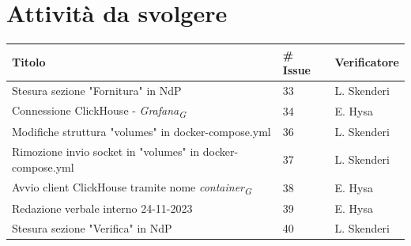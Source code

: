 \documentclass{article}
\begin{document}
\section{Attività da svolgere}
    \begin{center}
        \begin{tabular}{|C{7cm}|C{1,5cm}|C{3cm}|}
            \hline
            \textbf{Titolo} & \textbf{\# Issue} & \textbf{Verificatore} \\
            \hline\hline
            Stesura sezione "Fornitura" in NdP & 33 & L. Skenderi\\
            \hline
            Connessione ClickHouse - \textit{Grafana}\textsubscript{\textit{G}} & 34 & E. Hysa\\
            \hline
            Modifiche struttura "volumes" in docker-compose.yml & 36 & L. Skenderi\\
            \hline
            Rimozione invio socket in "volumes" in docker-compose.yml & 37 & L. Skenderi\\
            \hline
            Avvio client ClickHouse tramite nome \textit{container}\textsubscript{\textit{G}} & 38 & E. Hysa\\
            \hline
            Redazione verbale interno 24-11-2023 & 39 & E. Hysa\\
            \hline
            Stesura sezione "Verifica" in NdP & 40 & L. Skenderi\\
            \hline
        \end{tabular}
    \end{center}
\end{document}
